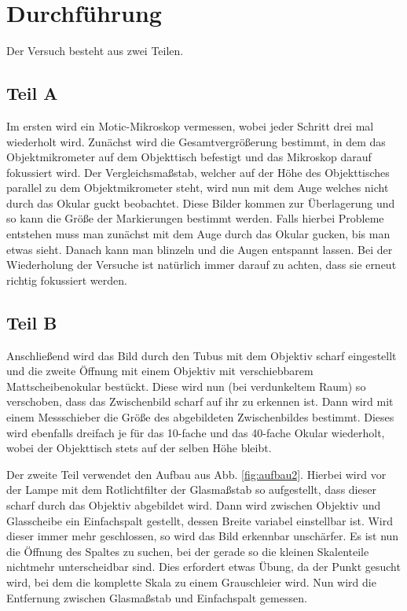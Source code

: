 \documentclass[12pt,a4paper,titlepage,headinclude,bibtotoc]{scrartcl}
\begin{document}
\section{Durchführung}
\label{sec:durchfuehrung}
Der Versuch besteht aus zwei Teilen.
\subsection{Teil A}
Im ersten wird ein Motic-Mikroskop vermessen, wobei jeder Schritt drei mal wiederholt wird.
Zunächst wird die Gesamtvergrößerung bestimmt, in dem das Objektmikrometer auf dem Objekttisch befestigt und das Mikroskop darauf fokussiert wird.
Der Vergleichsmaßstab, welcher auf der Höhe des Objekttisches parallel zu dem Objektmikrometer steht, wird nun mit dem Auge welches nicht durch das Okular guckt beobachtet.
Diese Bilder kommen zur Überlagerung und so kann die Größe der Markierungen bestimmt werden.
Falls hierbei Probleme entstehen muss man zunächst mit dem Auge durch das Okular gucken, bis man etwas sieht.
Danach kann man blinzeln und die Augen entspannt lassen.
Bei der Wiederholung der Versuche ist natürlich immer darauf zu achten, dass sie erneut richtig fokussiert werden.
\subsection{Teil B}
Anschließend wird das Bild durch den Tubus mit dem Objektiv scharf eingestellt und die zweite Öffnung mit einem Objektiv mit verschiebbarem Mattscheibenokular bestückt.
Diese wird nun (bei verdunkeltem Raum) so verschoben, dass das Zwischenbild scharf auf ihr zu erkennen ist.
Dann wird mit einem Messschieber die Größe des abgebildeten Zwischenbildes bestimmt.
Dieses wird ebenfalls dreifach je für das 10-fache und das 40-fache Okular wiederholt, wobei der Objekttisch stets auf der selben Höhe bleibt.


Der zweite Teil verwendet den Aufbau aus Abb. \ref{fig:aufbau2}.
Hierbei wird vor der Lampe mit dem Rotlichtfilter der Glasmaßstab so aufgestellt, dass dieser scharf durch das Objektiv abgebildet wird.
Dann wird zwischen Objektiv und Glasscheibe ein Einfachspalt gestellt, dessen Breite variabel einstellbar ist.
Wird dieser immer mehr geschlossen, so wird das Bild erkennbar unschärfer.
Es ist nun die Öffnung des Spaltes zu suchen, bei der gerade so die kleinen Skalenteile nichtmehr unterscheidbar sind.
Dies erfordert etwas Übung, da der Punkt gesucht wird, bei dem die komplette Skala zu einem Grauschleier wird.
Nun wird die Entfernung zwischen Glasmaßstab und Einfachspalt gemessen.
\end{document}
